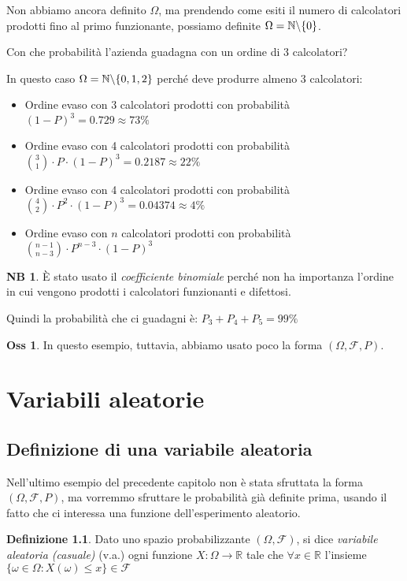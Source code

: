 \documentclass[12pt, a4paper]{report}
\theoremstyle{definition}
\newtheorem{definition}{Definizione}[section]
\newtheorem*{observation}{Oss}
\newtheorem*{note}{NB}
\DeclareRobustCommand{\F}{\mathcal{F}}%
\DeclareRobustCommand{\R}{\mathbb{R}}%
\DeclareRobustCommand{\N}{\mathbb{N}}%
\DeclareRobustCommand{\probspace}{(\Omega,\F,P)}
\DeclareRobustCommand{\probzspace}{(\Omega,\F)}
\begin{document}
Non abbiamo ancora definito $\Omega$, ma prendendo come esiti il numero di
calcolatori prodotti fino al primo funzionante, possiamo definite \(\Omega=\N
\symbol{92}\{0\}\).

\mbox{}\newline\noindent
Con che probabilità l'azienda guadagna con un ordine di 3 calcolatori?

In questo caso \(\Omega=\N\symbol{92}\{0,1,2\}\) perché deve produrre almeno 3
calcolatori:
\begin{itemize}
	\item Ordine evaso con 3 calcolatori prodotti con probabilità \((1-P)^3=0.729
	\approx 73\%\)
	\item Ordine evaso con 4 calcolatori prodotti con probabilità \(\binom{3}{1}
	\cdot P\cdot (1-P)^3=0.2187\approx 22\%\)
	\item Ordine evaso con 4 calcolatori prodotti con probabilità \(\binom{4}{2}
	\cdot P^2\cdot (1-P)^3=0.04374\approx 4\%\)
	\item Ordine evaso con $n$ calcolatori prodotti con probabilità \(\binom{n-1}
	{n-3}\cdot P^{n-3}\cdot (1-P)^3\)
\end{itemize}
\begin{note}
	È stato usato il \emph{coefficiente binomiale} perché non ha importanza
	l'ordine in cui vengono prodotti i calcolatori funzionanti e difettosi.
\end{note}

Quindi la probabilità che ci guadagni è: \(P_3+P_4+P_5=99\%\)
\begin{observation}
	In questo esempio, tuttavia, abbiamo usato poco la forma $\probspace$.
\end{observation}

\chapter{Variabili aleatorie}

\section{Definizione di una variabile aleatoria}
Nell'ultimo esempio del precedente capitolo non è stata sfruttata la forma $\probspace$,
ma vorremmo sfruttare le probabilità già definite prima, usando il fatto che ci
interessa una funzione dell'esperimento aleatorio.
\begin{definition}
	Dato uno spazio probabilizzante $\probzspace$, si dice \emph{variabile
	aleatoria (casuale)} (v.a.) ogni funzione \(X:\Omega\rightarrow\R\) tale che
	\(\forall x\in\R\) l'insieme \(\{\omega\in\Omega :X(\omega)\leq x\}\in\F\)
\end{definition}
\end{document}
